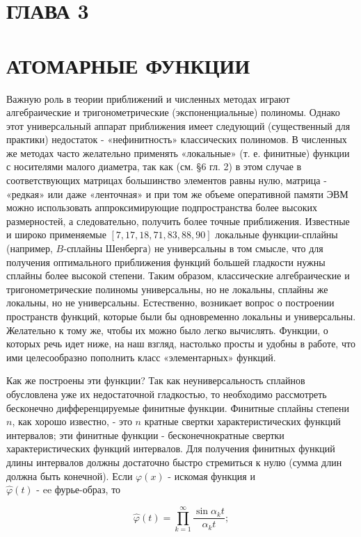 \documentclass[10pt]{article}
\begin{document}
\section*{ГЛАВА 3}
\section*{АТОМАРНЫЕ ФУНКЦИИ}
Важную роль в теории приближений и численных методах играют алгебраические и тригонометрические (экспоненциальные) полиномы. Однако этот универсальный аппарат приближения имеет следующий (существенный для практики) недостаток - «нефинитность» классических полиномов. В численных же методах часто желательно применять «локальные» (т. е. финитные) функции с носителями малого диаметра, так как (см. §6 гл. 2) в этом случае в соответствующих матрицах большинство элементов равны нулю, матрица - «редкая» или даже «ленточная» и при том же объеме оперативной памяти ЭВМ можно использовать аппроксимирующие подпространства более высоких размерностей, а следовательно, получить более точные приближения. Известные и широко применяемые $[7,17,18,71,83,88,90]$ локальные функции-сплайны (например, $B$-сплайны Шенберга) не универсальны в том смысле, что для получения оптимального приближения функций большей гладкости нужны сплайны более высокой степени. Таким образом, классические алгебраические и тригонометрические полиномы универсальны, но не локальны, сплайны же локальны, но не универсальны. Естественно, возникает вопрос о построении пространств функций, которые были бы одновременно локальны и универсальны. Желательно к тому же, чтобы их можно было легко вычислять. Функции, о которых речь идет ниже, на наш взгляд, настолько просты и удобны в работе, что ими целесообразно пополнить класс «элементарных» функций.

Как же построены эти функции? Так как неуниверсальность сплайнов обусловлена уже их недостаточной гладкостью, то необходимо рассмотреть бесконечно дифференцируемые финитные функции. Финитные сплайны степени $n$, как хорошо известно, - это $n$ кратные свертки характеристических функций интервалов; эти финитные функции - бесконечнократные свертки характеристических функций интервалов. Для получения финитных функций длины интервалов должны достаточно быстро стремиться к нулю (сумма длин должна быть конечной). Если $\varphi(x)$ - искомая функция и\\
$\hat{\varphi}(t)$ - ee фурье-образ, то

$$
\hat{\varphi}(t)=\prod_{k=1}^{\infty} \frac{\sin \alpha_{k} t}{\alpha_{k} t} ;
$$
\end{document}
